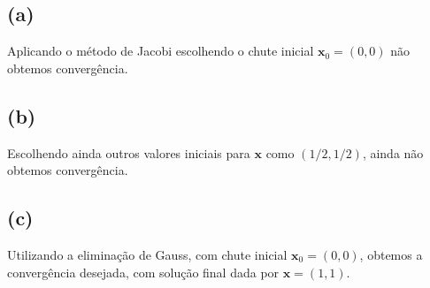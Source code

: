 \documentclass{article}
\begin{document}
\subsection*{(a)}

Aplicando o método de Jacobi escolhendo o chute inicial $\mathbf{x}_0 = (0, 0)$ não obtemos convergência. 

\subsection*{(b)}

Escolhendo ainda outros valores iniciais para $\mathbf{x}$ como $(1/2, 1/2)$, ainda não obtemos convergência.

\subsection*{(c)}

Utilizando a eliminação de Gauss, com chute inicial $\mathbf{x}_0 = (0, 0)$, obtemos a convergência desejada, 
com solução final dada por $\mathbf{x} = (1, 1)$.
\end{document}
